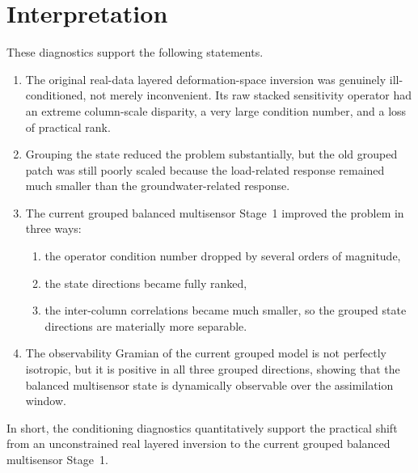 \documentclass[11pt]{article}
\begin{document}
\section{Interpretation}

These diagnostics support the following statements.

\begin{enumerate}
    \item The original real-data layered deformation-space inversion was genuinely ill-conditioned, not merely inconvenient. Its raw stacked sensitivity operator had an extreme column-scale disparity, a very large condition number, and a loss of practical rank.
    \item Grouping the state reduced the problem substantially, but the old grouped patch was still poorly scaled because the load-related response remained much smaller than the groundwater-related response.
    \item The current grouped balanced multisensor Stage~1 improved the problem in three ways:
    \begin{enumerate}
        \item the operator condition number dropped by several orders of magnitude,
        \item the state directions became fully ranked,
        \item the inter-column correlations became much smaller, so the grouped state directions are materially more separable.
    \end{enumerate}
    \item The observability Gramian of the current grouped model is not perfectly isotropic, but it is positive in all three grouped directions, showing that the balanced multisensor state is dynamically observable over the assimilation window.
\end{enumerate}

In short, the conditioning diagnostics quantitatively support the practical shift from an unconstrained real layered inversion to the current grouped balanced multisensor Stage~1.



\end{document}
